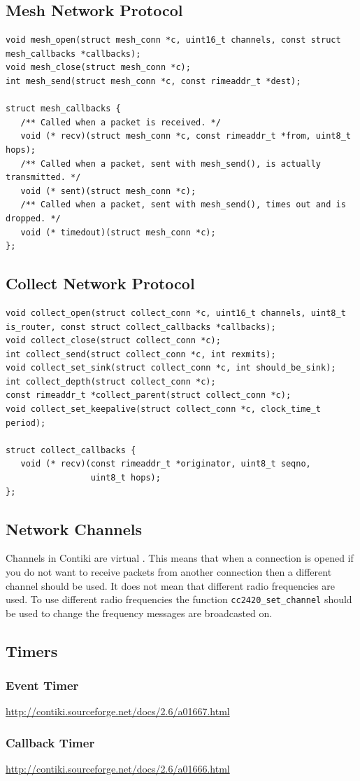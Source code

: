 \subsection{Mesh Network Protocol}

\begin{verbatim}
void mesh_open(struct mesh_conn *c, uint16_t channels, const struct mesh_callbacks *callbacks);
void mesh_close(struct mesh_conn *c);
int mesh_send(struct mesh_conn *c, const rimeaddr_t *dest);

struct mesh_callbacks {
   /** Called when a packet is received. */
   void (* recv)(struct mesh_conn *c, const rimeaddr_t *from, uint8_t hops);
   /** Called when a packet, sent with mesh_send(), is actually transmitted. */
   void (* sent)(struct mesh_conn *c);
   /** Called when a packet, sent with mesh_send(), times out and is dropped. */
   void (* timedout)(struct mesh_conn *c);
};
\end{verbatim}

\subsection{Collect Network Protocol}


\begin{verbatim}
void collect_open(struct collect_conn *c, uint16_t channels, uint8_t is_router, const struct collect_callbacks *callbacks);
void collect_close(struct collect_conn *c);
int collect_send(struct collect_conn *c, int rexmits);
void collect_set_sink(struct collect_conn *c, int should_be_sink);
int collect_depth(struct collect_conn *c);
const rimeaddr_t *collect_parent(struct collect_conn *c);
void collect_set_keepalive(struct collect_conn *c, clock_time_t period);

struct collect_callbacks {
   void (* recv)(const rimeaddr_t *originator, uint8_t seqno,
                 uint8_t hops);
};
\end{verbatim}


\subsection{Network Channels}

Channels in Contiki are virtual \cite{tel-aviv-contiki-exercises}. This means that when a connection is opened if you do not want to receive packets from another connection then a different channel should be used. It does not mean that different radio frequencies are used. To use different radio frequencies the function \verb|cc2420_set_channel| should be used to change the frequency messages are broadcasted on.


\subsection{Timers}

\subsubsection{Event Timer}

\url{http://contiki.sourceforge.net/docs/2.6/a01667.html}

\subsubsection{Callback Timer}

\url{http://contiki.sourceforge.net/docs/2.6/a01666.html}
